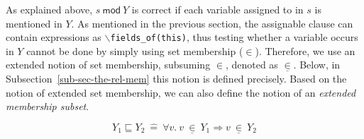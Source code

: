 \documentclass[a4paper]{llncs}
\newcommand{\defn}[1]{\:\hat{#1}\:}
\newcommand{\java}{\textsc{Java}}
\newcommand{\extmember}[2]{\ensuremath{#1\: \underline\in\: #2}}
\newcommand{\extsubset}[2]{\ensuremath{#1 \sqsubseteq #2}}
\newcommand{\fieldsofarg}[1]{\texttt{\(\backslash\)fields\_of(#1)}}
\begin{document}
As explained above, \(s\:\mathsf{mod}\:Y\) is correct if each variable 
assigned to in \(s\) is mentioned in \(Y\). As mentioned in the
previous section, the assignable clause can contain expressions as
\fieldsofarg{this}, thus testing whether a
variable occurs in \(Y\) cannot be done by simply using set
membership (\(\in\)). Therefore, we use an extended notion of set
membership, subsuming \(\in\), denoted as \(\underline\in\). Below, in 
Subsection~\ref{sub-sec-the-rel-mem} this notion is defined precisely.
Based on the notion of extended set membership, we can also define the 
notion of an \emph{extended membership subset}.

\begin{definition}
\label{def-subseq}
\[\extsubset{Y_1}{Y_2} \defn{=} \forall v.\ \extmember{v}{Y_1}
\Rightarrow \extmember{v}{Y_2}\]
\end{definition} 

%
\end{document}
